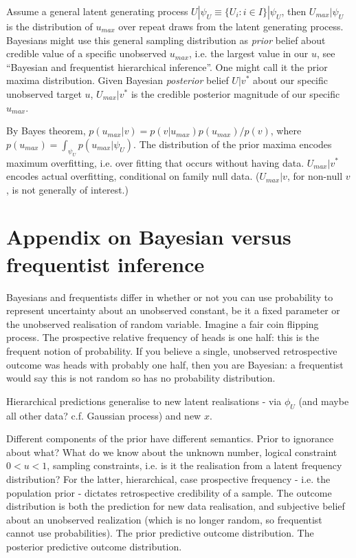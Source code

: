 \documentclass{article}
\begin{document}
Assume a general latent generating process $U|\psi_U \equiv \{U_i: i \in I \}|\psi_U$, then $U_{max}|\psi_U$ is the distribution of $u_{max}$ over repeat draws from the latent generating process. Bayesians might use this general sampling distribution as \textit{prior} belief about credible value of a specific unobserved $u_{max}$, i.e. the largest value in our $u$, see ``Bayesian and frequentist hierarchical inference''. One might call it the prior maxima distribution. Given Bayesian \textit{posterior} belief $U|v^*$ about our specific unobserved target $u$, $U_{max}|v^*$ is the credible posterior magnitude of our specific $u_{max}$. 

By Bayes theorem, $p(u_{max}|v) = p(v|u_{max})p(u_{max})/p(v)$, where $p(u_{max}) = \int_{\psi_U}p(u_{max}|\psi_U)$. The distribution of the prior maxima encodes maximum overfitting, i.e. over fitting that occurs without having data. $U_{max}|v^*$ encodes actual overfitting, conditional on family null data. ($U_{max}|v$, for non-null $v$, is not generally of interest.)

\section{Appendix on Bayesian versus frequentist inference}

Bayesians and frequentists differ in whether or not you can use probability to represent uncertainty about an unobserved constant, be it a fixed parameter or the unobserved realisation of random variable. Imagine a fair coin flipping process. The prospective relative frequency of heads is one half: this is the frequent notion of probability. If you believe a single, unobserved retrospective outcome was heads with probably one half, then you are Bayesian: a frequentist would say this is not random so has no probability distribution. 

Hierarchical predictions generalise to new latent realisations - via $\phi_U$ (and maybe all other data? c.f. Gaussian process) and new $x$.

Different components of the prior have different semantics. Prior to ignorance about what? What do we know about the unknown number, logical constraint $0<u<1$, sampling constraints, i.e. is it the realisation from a latent frequency distribution? For the latter, hierarchical, case prospective frequency - i.e. the population prior - dictates retrospective credibility of a sample. The outcome distribution is both the prediction for new data realisation, and subjective belief about an unobserved realization (which is no longer random, so frequentist cannot use probabilities). The prior predictive outcome distribution. The posterior predictive outcome distribution.
\end{document}
